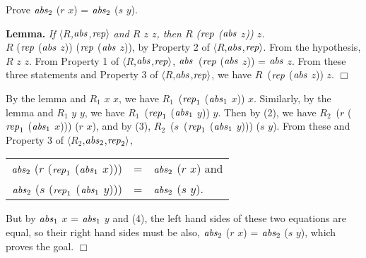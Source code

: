 \documentclass[envcountsame,runningheads]{llncs}
\begin{document}
 Prove ${\it abs}_2$ ($r$ $x$) = ${\it abs}_2$ ($s$ $y$).
\begin{center}
\begin{minipage}{3.8in}
{\bf Lemma.} {\it
If
$\langle R$,${\it abs}$,${\it rep} \rangle$
and
$R$ $z$ $z$, then {\rm $R$ (${\it rep}$ (${\it abs}$ $z$)) $z$}.
} \\
$R$ (${\it rep}$ (${\it abs}$ $z$)) (${\it rep}$ (${\it abs}$ $z$)),
by Property 2 of
$\langle R$,${\it abs}$,${\it rep} \rangle$.
From the hypothesis,
$R$ $z$ $z$.
From Property 1 of
$\langle R$,${\it abs}$,${\it rep} \rangle$,
\linebreak[3]
${\it abs}$~(${\it rep}$ (${\it abs}$ $z$)) = ${\it abs}$ $z$.
From these three statements and Property 3 of
$\langle R$,${\it abs}$,${\it rep} \rangle$,
we have
$R$~(${\it rep}$ (${\it abs}$ $z$)) $z$.
%
$\Box$
\end{minipage}
\end{center}

By the lemma and $R_1$ $x$ $x$, we have
$R_1$~(${\it rep}_1$ (${\it abs}_1$ $x$)) $x$.
Similarly,
by the lemma and $R_1$ $y$ $y$, we have
$R_1$~(${\it rep}_1$ (${\it abs}_1$ $y$)) $y$.
Then by (2), we have
\linebreak[3]
$R_2$~($r$ (${\it rep}_1$ (${\it abs}_1$ $x$))) ($r$ $x$), and
by (3),
$R_2$~($s$~(${\it rep}_1$ (${\it abs}_1$ $y$))) ($s$ $y$).
From these and Property 3 of
$\langle R_2$,${\it abs}_2$,${\it rep}_2 \rangle$,
\begin{center}
\begin{tabular}{rcl}
${\it abs}_2$ ($r$ (${\it rep}_1$ (${\it abs}_1$ $x$)))
& = & ${\it abs}_2$ ($r$ $x$)
and \\
${\it abs}_2$ ($s$ (${\it rep}_1$ (${\it abs}_1$ $y$)))
& = & ${\it abs}_2$ ($s$ $y$).
\end{tabular}
\end{center}
But by ${\it abs}_1$ $x$ = ${\it abs}_1$ $y$ and (4),
the left hand sides of these two equations are equal, so
their right hand sides must be also,
${\it abs}_2$ ($r$ $x$) = ${\it abs}_2$ ($s$ $y$), which proves the goal.
$\Box$
\end{document}
